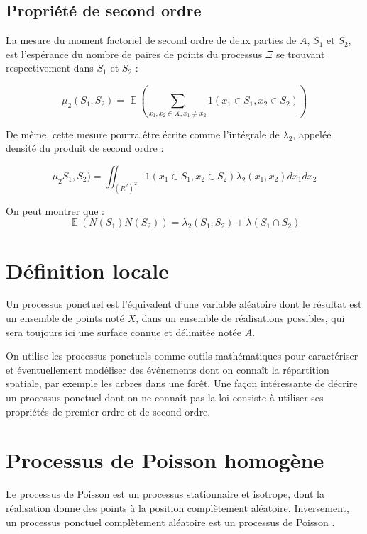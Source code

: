 \documentclass[
  11pt,
  french,
  A4paper,
  extrafontsizes,onecolumn,openright
  ]{memoir}
\theoremstyle{definition}
\theoremstyle{definition}
\theoremstyle{definition}
\theoremstyle{remark}
\begin{document}
\subsection{Propriété de second ordre}\label{propriete-de-second-ordre}

La mesure du moment factoriel de second ordre de deux parties de \(A\),
\(S_1\) et \(S_2\), est l'espérance du nombre de paires de points du
processus \(\Xi\) se trouvant respectivement dans \(S_1\) et \(S_2\) :

\begin{equation}
  \mu_2(S_1,S_2 ) = \mathop{\mathbb{E}}\left(\sum_{x_1 ,x_2 \in X, x_1 \ne x_2}{1(x_1 \in S_1, x_2 \in S_2)} \right)
  \label{eq:mu2}
\end{equation}

De même, cette mesure pourra être écrite comme l'intégrale de
\(\lambda_2\), appelée densité du produit de second ordre :

\begin{equation}
  \mu_2 S_1,S_2 ) = \iint_{(R^2)^2}{1(x_1 \in S_1, x_2 \in S_2) \lambda_2(x_1, x_2)dx_1 dx_2}
\end{equation}

On peut montrer \autocite{Moller2004} que :
\[ \mathop{\mathbb{E}}(N(S_1 )N(S_2 )) = \lambda_2(S_1,S_2)+\lambda(S_1 \cap S_2)\]

\section{Définition locale}\label{definition-locale}

Un processus ponctuel est l'équivalent d'une variable aléatoire dont le
résultat est un ensemble de points noté \(X\), dans un ensemble de
réalisations possibles, qui sera toujours ici une surface connue et
délimitée notée \(A\).

On utilise les processus ponctuels comme outils mathématiques pour
caractériser et éventuellement modéliser des événements dont on connaît
la répartition spatiale, par exemple les arbres dans une forêt. Une
façon intéressante de décrire un processus ponctuel dont on ne connaît
pas la loi consiste à utiliser ses propriétés de premier ordre et de
second ordre.

\section{Processus de Poisson
homogène}\label{processus-de-poisson-homogene}

Le processus de Poisson est un processus stationnaire et isotrope, dont
la réalisation donne des points à la position complètement aléatoire.
Inversement, un processus ponctuel complètement aléatoire est un
processus de Poisson \autocite[démonstration :][pp.~51-52]{Diggle1983}.
\end{document}
